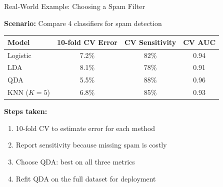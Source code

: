 \documentclass[aspectratio=169, 11pt]{beamer}
\begin{document}
\begin{frame}{Real-World Example: Choosing a Spam Filter}

\textbf{Scenario:} Compare 4 classifiers for spam detection

\vspace{0.3em}
\begin{center}
\begin{tabular}{lccc}
\toprule
Model & 10-fold CV Error & CV Sensitivity & CV AUC \\
\midrule
Logistic & 7.2\% & 82\% & 0.94 \\
LDA & 8.1\% & 78\% & 0.91 \\
\textcolor{softgreen}{QDA} & \textcolor{softgreen}{5.5\%} & \textcolor{softgreen}{88\%} & \textcolor{softgreen}{0.96} \\
KNN ($K=5$) & 6.8\% & 85\% & 0.93 \\
\bottomrule
\end{tabular}
\end{center}

\vspace{0.3em}
\textbf{Steps taken:}
\begin{enumerate}
  \item 10-fold CV to estimate error for each method
  \item Report sensitivity because missing spam is costly
  \item Choose QDA: best on all three metrics
  \item Refit QDA on the full dataset for deployment
\end{enumerate}
\end{frame}
\end{document}
